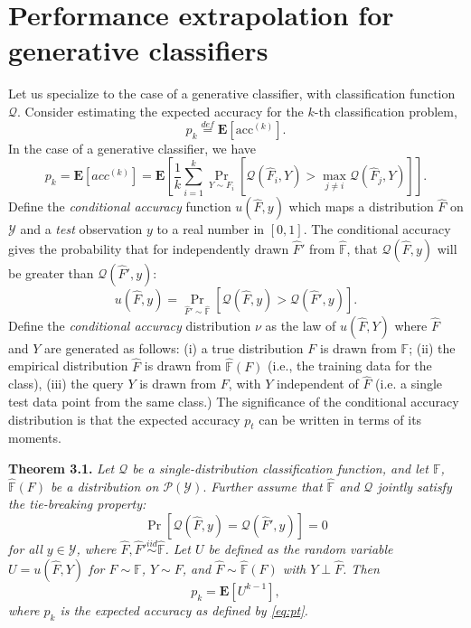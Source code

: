 \documentclass{article}
\newcommand{\E}{\textbf{E}}
\begin{document}
\section{Performance extrapolation for generative classifiers}

Let us specialize to the case of a generative classifier, with classification function $\mathcal{Q}$.
Consider estimating the expected accuracy for the $k$-th classification problem,
\begin{equation}\label{eq:pt}
p_k \stackrel{def}{=} \E[\text{acc}^{(k)}].\end{equation}
In the case of a generative classifier, we have
\[
p_k = \E[acc^{(k)}] = \E\left[\frac{1}{k}\sum_{i=1}^k \Pr_{Y \sim F_i}[\mathcal{Q}(\hat{F}_i, Y) > \max_{j \neq i}\mathcal{Q}(\hat{F}_j, Y)]\right].
\]
Define the \emph{conditional accuracy} function $u(\hat{F}, y)$ which maps a
distribution $\hat{F}$ on $\mathcal{Y}$ and a \emph{test} observation $y$ to
a real number in $[0,1]$.  The conditional accuracy gives the
probability that for independently drawn $\hat{F}'$ from $\hat{\mathbb{F}}$, that
$\mathcal{Q}(\hat{F}, y)$ will be greater than $\mathcal{Q}(\hat{F}', y)$:
\[
u(\hat{F}, y) = \Pr_{\hat{F}' \sim \hat{\mathbb{F}}}[\mathcal{Q}(\hat{F}, y) > \mathcal{Q}(\hat{F}', y)].
\]
Define the \emph{conditional accuracy} distribution $\nu$ as the law
of $u(\hat{F}, Y)$ where $\hat{F}$ and $Y$ are generated as follows:
(i) a true distribution $F$ is drawn from $\mathbb{F}$; 
(ii) the empirical distribution $\hat{F}$ is drawn from $\hat{\mathbb{F}}(F)$ (i.e., the training data for the class),
(iii) the query $Y$ is drawn from $F$, with $Y$ independent of $\hat{F}$ (i.e. a single test data point from the same class.)
The significance of the conditional accuracy
distribution is that the expected accuracy $p_t$ can be
written in terms of its moments.

\noindent\textbf{Theorem 3.1.} \emph{
Let $\mathcal{Q}$ be a single-distribution classification function, and let $\mathbb{F}$, $\hat{\mathbb{F}}(F)$ be a distribution on $\mathcal{P}(\mathcal{Y}).$
Further assume that
$\hat{\mathbb{F}}$ and $\mathcal{Q}$ jointly satisfy the
\emph{tie-breaking} property:
\begin{equation}\label{eq:tie}
\Pr[\mathcal{Q}(\hat{F}, y) = \mathcal{Q}(\hat{F}', y)] = 0
\end{equation}
for all $y \in \mathcal{Y}$, where $\hat{F}, \hat{F}' \stackrel{iid}{\sim} \hat{\mathbb{F}}$.
Let $U$ be defined as the random variable
$U = u(\hat{F}, Y)$
for $F \sim \mathbb{F}$, $Y \sim F$, and $\hat{F} \sim \hat{\mathbb{F}}(F)$ with $Y \perp \hat{F}$.
Then \[p_k = \E[U^{k-1}],\]
where $p_k$ is the expected accuracy as defined by \eqref{eq:pt}.
}
\end{document}
